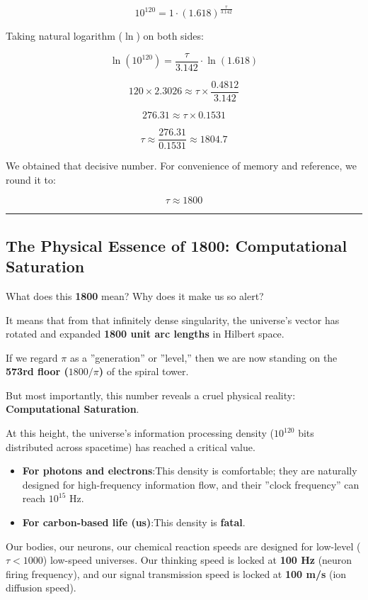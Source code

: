 $$10^{120} = 1 \cdot (1.618)^{\frac{\tau}{3.142}}$$

Taking natural logarithm ($\ln$) on both sides:

$$\ln(10^{120}) = \frac{\tau}{3.142} \cdot \ln(1.618)$$

$$120 \times 2.3026 \approx \tau \times \frac{0.4812}{3.142}$$

$$276.31 \approx \tau \times 0.1531$$

$$\tau \approx \frac{276.31}{0.1531} \approx 1804.7$$

We obtained that decisive number. For convenience of memory and reference, we round it to:

\textbf{$$\tau \approx 1800$$}

\hrule

\subsection{The Physical Essence of 1800: Computational Saturation}

What does this \textbf{1800} mean? Why does it make us so alert?

It means that from that infinitely dense singularity, the universe's vector has rotated and expanded \textbf{1800 unit arc lengths} in Hilbert space.

If we regard $\pi$ as a ''generation'' or ''level,'' then we are now standing on the \textbf{573rd floor ($1800/\pi$)} of the spiral tower.

But most importantly, this number reveals a cruel physical reality: \textbf{Computational Saturation}.

At this height, the universe's information processing density ($10^{120}$ bits distributed across spacetime) has reached a critical value.

\begin{itemize}
\item \textbf{For photons and electrons}:This density is comfortable; they are naturally designed for high-frequency information flow, and their ''clock frequency'' can reach $10^{15}$ Hz.

\item \textbf{For carbon-based life (us)}:This density is \textbf{fatal}.
\end{itemize}

Our bodies, our neurons, our chemical reaction speeds are designed for low-level ($\tau < 1000$) low-speed universes. Our thinking speed is locked at \textbf{100 Hz} (neuron firing frequency), and our signal transmission speed is locked at \textbf{100 m/s} (ion diffusion speed).

